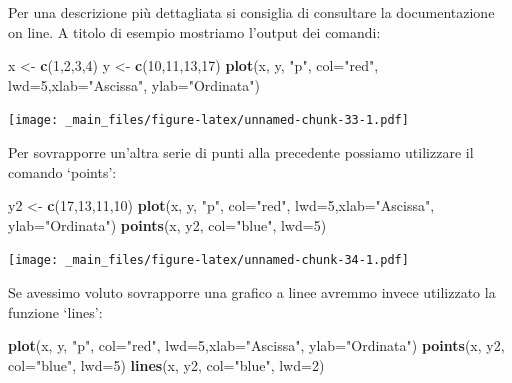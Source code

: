 \documentclass[a4paper,12pt,oneside]{book}
\newenvironment{Shaded}{\begin{snugshade}}{\end{snugshade}}
\newcommand{\KeywordTok}[1]{\textcolor[rgb]{0.13,0.29,0.53}{\textbf{#1}}}
\newcommand{\DataTypeTok}[1]{\textcolor[rgb]{0.13,0.29,0.53}{#1}}
\newcommand{\DecValTok}[1]{\textcolor[rgb]{0.00,0.00,0.81}{#1}}
\newcommand{\StringTok}[1]{\textcolor[rgb]{0.31,0.60,0.02}{#1}}
\newcommand{\NormalTok}[1]{#1}
\begin{document}
Per una descrizione più dettagliata si consiglia di consultare la
documentazione on line. A titolo di esempio mostriamo l'output dei
comandi:

\begin{Shaded}
\begin{Highlighting}[]
\NormalTok{x  <-}\StringTok{  }\KeywordTok{c}\NormalTok{(}\DecValTok{1}\NormalTok{,}\DecValTok{2}\NormalTok{,}\DecValTok{3}\NormalTok{,}\DecValTok{4}\NormalTok{)}
\NormalTok{y  <-}\StringTok{  }\KeywordTok{c}\NormalTok{(}\DecValTok{10}\NormalTok{,}\DecValTok{11}\NormalTok{,}\DecValTok{13}\NormalTok{,}\DecValTok{17}\NormalTok{)}
\KeywordTok{plot}\NormalTok{(x, y, }\StringTok{"p"}\NormalTok{, }\DataTypeTok{col=}\StringTok{"red"}\NormalTok{, }\DataTypeTok{lwd=}\DecValTok{5}\NormalTok{,}\DataTypeTok{xlab=}\StringTok{"Ascissa"}\NormalTok{, }\DataTypeTok{ylab=}\StringTok{"Ordinata"}\NormalTok{)}
\end{Highlighting}
\end{Shaded}

\texttt{[image: \_main\_files/figure-latex/unnamed-chunk-33-1.pdf]}

Per sovrapporre un'altra serie di punti alla precedente possiamo
utilizzare il comando `points':

\begin{Shaded}
\begin{Highlighting}[]
\NormalTok{y2  <-}\StringTok{  }\KeywordTok{c}\NormalTok{(}\DecValTok{17}\NormalTok{,}\DecValTok{13}\NormalTok{,}\DecValTok{11}\NormalTok{,}\DecValTok{10}\NormalTok{)}
\KeywordTok{plot}\NormalTok{(x, y, }\StringTok{"p"}\NormalTok{, }\DataTypeTok{col=}\StringTok{"red"}\NormalTok{, }\DataTypeTok{lwd=}\DecValTok{5}\NormalTok{,}\DataTypeTok{xlab=}\StringTok{"Ascissa"}\NormalTok{, }\DataTypeTok{ylab=}\StringTok{"Ordinata"}\NormalTok{)}
\KeywordTok{points}\NormalTok{(x, y2, }\DataTypeTok{col=}\StringTok{"blue"}\NormalTok{, }\DataTypeTok{lwd=}\DecValTok{5}\NormalTok{)}
\end{Highlighting}
\end{Shaded}

\texttt{[image: \_main\_files/figure-latex/unnamed-chunk-34-1.pdf]}

Se avessimo voluto sovrapporre una grafico a linee avremmo invece
utilizzato la funzione `lines':

\begin{Shaded}
\begin{Highlighting}[]
\KeywordTok{plot}\NormalTok{(x, y, }\StringTok{"p"}\NormalTok{, }\DataTypeTok{col=}\StringTok{"red"}\NormalTok{, }\DataTypeTok{lwd=}\DecValTok{5}\NormalTok{,}\DataTypeTok{xlab=}\StringTok{"Ascissa"}\NormalTok{, }\DataTypeTok{ylab=}\StringTok{"Ordinata"}\NormalTok{)}
\KeywordTok{points}\NormalTok{(x, y2, }\DataTypeTok{col=}\StringTok{"blue"}\NormalTok{, }\DataTypeTok{lwd=}\DecValTok{5}\NormalTok{)}
\KeywordTok{lines}\NormalTok{(x, y2, }\DataTypeTok{col=}\StringTok{"blue"}\NormalTok{, }\DataTypeTok{lwd=}\DecValTok{2}\NormalTok{)}
\end{Highlighting}
\end{Shaded}
\end{document}
